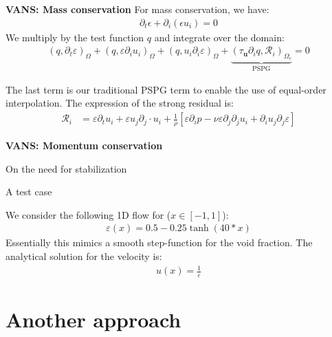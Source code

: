 \documentclass[c,11pt,xcolor=dvipsnames, aspectratio=169]{beamer}
\newcommand{\bra}[1]{\left[#1\right]}
\newcommand{\pp}[1]{\left(#1\right)}
\newcommand{\vm}[1]{\bm{#1}}
\begin{document}
\begin{frame}{\textbf{VANS: Mass conservation}}
For mass conservation, we have:
\begin{align*}
\partial_t \epsilon + \partial_i (\epsilon u_i) = 0
\end{align*}
We multiply by the test function $q$ and integrate over the domain:
\begin{align*}
	\pp{q,\partial_t \varepsilon}_\Omega + \pp{q, \varepsilon \partial_i u_i}_\Omega + \pp{q, u_i \partial_i \varepsilon}_\Omega + \underbrace{\pp{\tau_{\vm{u}} \partial_i q, \mathcal{R}_{i}}_{\Omega_e}}_{\mathrm{PSPG}} = 0
\end{align*}

The last term is our traditional PSPG term to enable the use of equal-order interpolation. The expression of the strong residual is:
\begin{align*}
	\mathcal{R}_{i} &= \varepsilon \partial_t u_i + \varepsilon {u_j} \partial_j \cdot {u_i} 
	+ \frac{1}{\rho} \bra{\varepsilon \partial_i p - \nu \varepsilon \partial_j \partial_j {u_i} + \partial_i {u_j} \partial_j \varepsilon}
\end{align*}
\end{frame}
\begin{frame}{\textbf{VANS: Momentum conservation}}
\end{frame}

\begin{frame}{On the need for stabilization }
\end{frame}

\begin{frame}{A test case}

	We consider the following 1D flow for ($x\in[-1,1]$):
	\begin{align}
	\varepsilon(x) = 0.5-0.25\tanh (40*x)
	\end{align}
Essentially this mimics a smooth step-function for the void fraction. The analytical solution for the velocity is:
\begin{align}
u(x) = \frac{1}{\varepsilon}
\end{align}

\end{frame}



\section{Another approach}
\end{document}
